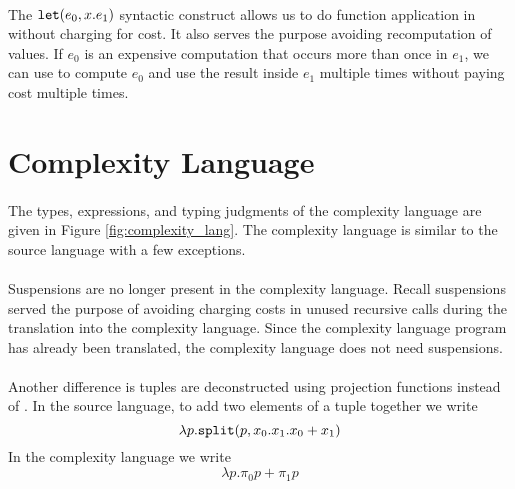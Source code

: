 \paragraph{}
The $\texttt{let}(e_0,x.e_1)$ syntactic construct allows us to do function
application in  without charging for cost. It also serves the purpose
avoiding recomputation of values. If $e_0$ is an expensive computation that
occurs more than once in $e_1$, we can use  to compute $e_0$ and use the
result inside $e_1$ multiple times without paying cost multiple times.



\section{Complexity Language}

\paragraph{}
The types, expressions, and typing judgments of the complexity language are
given in Figure \ref{fig:complexity_lang}.  The complexity language is similar
to the source language with a few exceptions.

\paragraph{}
Suspensions are no longer present in the complexity language. Recall
suspensions served the purpose of avoiding charging costs in unused recursive
calls during the translation into the complexity language. Since the complexity
language program has already been translated, the complexity language does not
need suspensions.

\paragraph{}
Another difference is tuples are deconstructed using projection functions
instead of . In the source language, to add two elements of a tuple
together we write
%
\[
  \lambda p.\texttt{split}(p,x_0.x_1.x_0 + x_1)
\]
%
In the complexity language we write
%
\[
  \lambda p.\pi_0 p + \pi_1 p
\]
%


